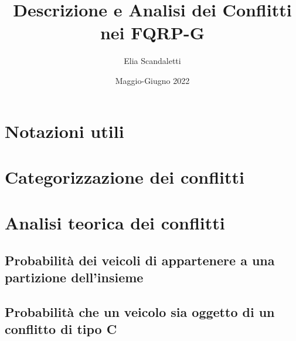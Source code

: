 \documentclass{article}
\title{Descrizione e Analisi dei Conflitti nei FQRP-G}
\author{Elia Scandaletti}
\date{Maggio-Giugno 2022}
\begin{document}
\maketitle

\tableofcontents

\section{Notazioni utili}


\section{Categorizzazione dei conflitti}


\section{Analisi teorica dei conflitti}
\subsection{Probabilità dei veicoli di appartenere a una partizione dell'insieme}

\subsection{Probabilità che un veicolo sia oggetto di un conflitto di tipo C}

\end{document}
